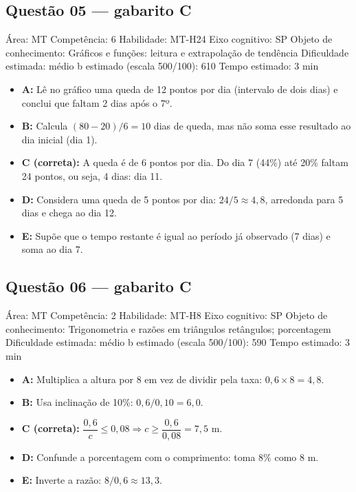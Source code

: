 \documentclass[10pt,a4paper,twocolumn]{article}
\begin{document}
\subsection*{Questão 05 — gabarito C}
{\small Área: MT \textbullet{} Competência: 6 \textbullet{} Habilidade: MT-H24 \textbullet{} Eixo cognitivo: SP \textbullet{} Objeto de conhecimento: Gráficos e funções: leitura e extrapolação de tendência \textbullet{} Dificuldade estimada: médio \textbullet{} b estimado (escala 500/100): 610 \textbullet{} Tempo estimado: 3 min}\par
\begin{itemize}[leftmargin=1.5em,itemsep=1pt]
\item \textbf{A:} Lê no gráfico uma queda de 12 pontos por dia (intervalo de dois dias) e conclui que faltam 2 dias após o 7º.
\item \textbf{B:} Calcula $(80 - 20)/6 = 10$ dias de queda, mas não soma esse resultado ao dia inicial (dia 1).
\item \textbf{C (correta):} A queda é de 6 pontos por dia. Do dia 7 (44\%) até 20\% faltam 24 pontos, ou seja, 4 dias: dia 11.
\item \textbf{D:} Considera uma queda de 5 pontos por dia: $24/5 \approx 4{,}8$, arredonda para 5 dias e chega ao dia 12.
\item \textbf{E:} Supõe que o tempo restante é igual ao período já observado (7 dias) e soma ao dia 7.
\end{itemize}
\subsection*{Questão 06 — gabarito C}
{\small Área: MT \textbullet{} Competência: 2 \textbullet{} Habilidade: MT-H8 \textbullet{} Eixo cognitivo: SP \textbullet{} Objeto de conhecimento: Trigonometria e razões em triângulos retângulos; porcentagem \textbullet{} Dificuldade estimada: médio \textbullet{} b estimado (escala 500/100): 590 \textbullet{} Tempo estimado: 3 min}\par
\begin{itemize}[leftmargin=1.5em,itemsep=1pt]
\item \textbf{A:} Multiplica a altura por 8 em vez de dividir pela taxa: $0{,}6 \times 8 = 4{,}8$.
\item \textbf{B:} Usa inclinação de 10\%: $0{,}6/0{,}10 = 6{,}0$.
\item \textbf{C (correta):} $\dfrac{0{,}6}{c} \leq 0{,}08 \Rightarrow c \geq \dfrac{0{,}6}{0{,}08} = 7{,}5$ m.
\item \textbf{D:} Confunde a porcentagem com o comprimento: toma 8\% como 8 m.
\item \textbf{E:} Inverte a razão: $8/0{,}6 \approx 13{,}3$.
\end{itemize}
\end{document}
